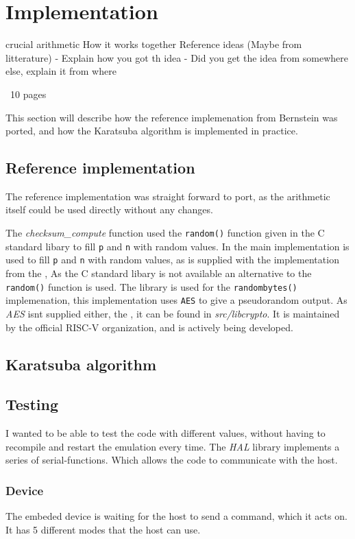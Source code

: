 \section{Implementation}
    crucial arithmetic
    How it works together
    Reference ideas (Maybe from litterature)
    - Explain how you got th idea
    - Did you get the idea from somewhere else, explain it from where

~10 pages

This section will describe how the reference implemenation from Bernstein was ported, and how the Karatsuba algorithm is implemented in practice.
\subsection{Reference implementation}
The reference implementation was straight forward to port, as the arithmetic itself could be used directly without any changes.


The \textit{checksum_compute} function used the \texttt{random()} function given in the C standard libary to fill \texttt{p} and \texttt{n} with random values. In the main implementation  is used to fill \texttt{p} and \texttt{n} with random values, as  is supplied with the implementation from the \cite[rainbowgit implemenation]{rainbowgit}, 
As the C standard libary is not available an alternative to the \texttt{random()} function is used. The library \cite[rainbowgit]{rainbowgit} is used for the \texttt{randombytes()} implemenation, this implementation uses \texttt{AES} to give a pseudorandom output. As \textit{AES} isnt supplied either, the \cite[libcrypto library]{libcrypto}, it can be found in \textit{src/libcrypto}. It is maintained by the official RISC-V organization, and is actively being developed.



\subsection{Karatsuba algorithm}


\subsection{Testing}
I wanted to be able to test the code with different values, without having to recompile and restart the emulation every time. The \textit{HAL} library implements a series of serial-functions. Which allows the code to communicate with the host.
\subsubsection{Device}
The embeded device is waiting for the host to send a command, which it acts on. It has 5 different modes that the host can use. 


